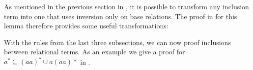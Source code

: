 \documentclass[a4paper,twoside,12pt, english]{article}
\begin{document}
As mentioned in the previous section in , it is possible to transform any inclusion term into one that uses inversion only on base relations. The proof in  for this lemma therefore provides some useful transformations:
\pagebreak
With the rules from the last three subsections, we can now proof inclusions between relational terms. As an example we give a proof for $a^* \subseteq (aa)^* \cup a(aa)*$ in .
\end{document}
